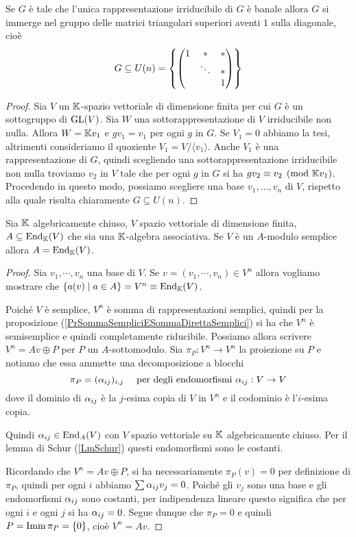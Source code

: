 \begin{lemma}\label{LmUnicaRappresentazioneIrriducibileBanaleImplicaUpperTriangularCon1SuDiagonale}
Se $G$ \`e tale che l'unica rappresentazione irriducibile di $G$ \`e banale allora $G$ si immerge nel gruppo delle matrici triangolari superiori aventi $1$ sulla diagonale, cio\`e
\[G\subseteq U(n)=\left\{ \begin{pmatrix}1 & \ast & \ast\\ &\ddots &\ast\\ &&1\end{pmatrix}\right\}\]
\end{lemma}
\begin{proof}
    Sia $V$ un $\mathbb{K}$-spazio vettoriale di dimensione finita per cui $G$ è un sottogruppo di $\operatorname{GL}(V)$. Sia $W$ una sottorappresentazione di $V$ irriducibile non nulla. Allora $W=\mathbb{K} v_1$ e $g v_1=v_1$ per ogni $g$ in $G$. Se $V_1=0$ abbiamo la tesi, altrimenti consideriamo il quoziente $V_1=V/\langle v_1\rangle$. Anche $V_1$ \`e una rappresentazione di $G$, quindi scegliendo una sottorappresentazione irriducibile non nulla troviamo $v_2$ in $V$ tale che per ogni $g$ in $G$ si ha $gv_2\equiv v_2 \pmod{\mathbb{K} v_1}$. Procedendo in questo modo, possiamo scegliere una base $v_1,\ldots,v_n$ di $V$, rispetto alla quale risulta chiaramente $G\subseteq U(n)$.
\end{proof}

\begin{theorem}\label{ThSottoalgebraAssociativaDiEndomorfismiDiSempliceETuttiGliEndomorfismi}
Sia $\mathbb{K}$ algebricamente chiuso, $V$ spazio vettoriale di dimensione finita, $A\subseteq \operatorname{End}_{\mathbb{K}}(V)$ che sia una $\mathbb{K}$-algebra associativa. Se $V$ \`e un $A$-modulo semplice allora $A=\operatorname{End}_{\mathbb{K}}(V)$.
\end{theorem}
\begin{proof}
Sia $v_1,\cdots, v_n$ una base di $V$. Se $v=(v_1,\cdots, v_n)\in V^n$ allora vogliamo mostrare che $\left\{ a(v)\mid a\in A\right\}=V^n\equiv \operatorname{End}_{\mathbb{K}}(V)$.

Poich\'e $V$ \`e semplice, $V^n$ \`e somma di rappresentazioni semplici, quindi per la proposizione (\ref{PrSommaSempliciESommaDirettaSemplici}) si ha che $V^n$ \`e semisemplice e quindi completamente riducibile. Possiamo allora scrivere $V^n=Av\oplus P$ per $P$ un $A$-sottomodulo. Sia $\pi_P:V^n\to V^n$ la proiezione su $P$ e notiamo che essa ammette una decomposizione a blocchi
\[\pi_P=(\alpha_{ij})_{i,j}\quad\text{ per degli endomorfismi }\alpha_{ij}:V\to V\]
dove il dominio di $\alpha_{ij}$ \`e la $j$-esima copia di $V$ in $V^n$ e il codominio \`e l'$i$-esima copia.

Quindi $\alpha_{ij}\in \operatorname{End}_A(V)$ con $V$ spazio vettoriale su $\mathbb{K}$ algebricamente chiuso. Per il lemma di Schur (\ref{LmSchur}) questi endomorfismi sono le costanti.

Ricordando che $V^n=Av\oplus P$, si ha necessariamente $\pi_P(v)=0$ per definizione di $\pi_P$, quindi per ogni $i$ abbiamo $\sum \alpha_{ij}v_j=0$. Poich\'e gli $v_j$ sono una base e gli endomorfismi $\alpha_{ij}$ sono costanti, per indipendenza lineare questo significa che per ogni $i$ e ogni $j$ si ha $\alpha_{ij}=0$. Segue dunque che $\pi_P=0$ e quindi $P=\operatorname{Imm} \pi_P=\left\{ 0\right\}$, cio\`e $V^n=Av$.
\end{proof}

